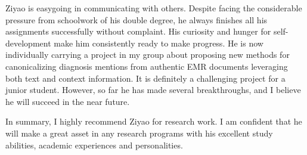 \documentclass[12pt]{article}
\begin{document}
Ziyao is easygoing in communicating with others. Despite facing the considerable pressure from schoolwork of his double degree, he always finishes all his assignments successfully without complaint. His curiosity and hunger for self-development make him consistently ready to make progress. He is now individually carrying a project in my group about proposing new methods for canonicalizing diagnosis mentions from authentic EMR documents leveraging both text and context information. It is definitely a challenging project for a junior student. However, so far he has made several breakthroughs, and I believe he will succeed in the near future.

In summary, I highly recommend Ziyao for research work. I am confident that he will make a great asset in any research programs with his excellent study abilities, academic experiences and personalities.
\end{document}
